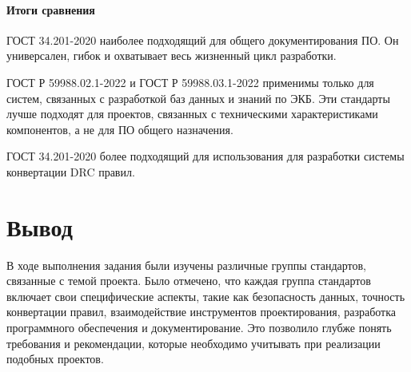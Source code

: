 \paragraph{Итоги сравнения}

ГОСТ 34.201-2020 наиболее подходящий для общего документирования ПО.
Он универсален, гибок и охватывает весь жизненный цикл разработки.

ГОСТ Р 59988.02.1-2022 и ГОСТ Р 59988.03.1-2022 применимы только для систем,
связанных с разработкой баз данных и знаний по ЭКБ.
Эти стандарты лучше подходят для проектов,
связанных с техническими характеристиками компонентов,
а не для ПО общего назначения. 

ГОСТ 34.201-2020 более подходящий для использования
для разработки системы конвертации DRC правил.

\clearpage

\section*{\LARGE Вывод}

В ходе выполнения задания были изучены различные группы стандартов,
связанные с темой проекта.
Было отмечено, что каждая группа стандартов включает
свои специфические аспекты,
такие как безопасность данных, точность конвертации правил,
взаимодействие инструментов проектирования,
разработка программного обеспечения и документирование.
Это позволило глубже понять требования и рекомендации,
которые необходимо учитывать при реализации подобных проектов.

